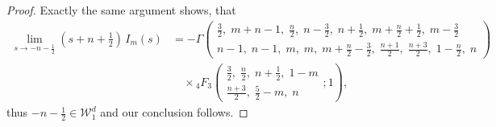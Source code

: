 \documentclass[10pt,a4paper]{amsart}
\begin{document}
\begin{proof}
Exactly the same argument shows, that 
\begin{align*}
     \lim_{s\rightarrow -n-\frac{1}{2}} (s+n+\frac{1}{2})\,I_m(s) &=
-\Gamma\!\left(
\begin{matrix}
\frac32, \; m+n-1,\; \frac n2,\; n-\frac32,\; n+\frac12,\;
m+\frac n2+\frac12,\; m-\frac32
\\[3pt]
n-1,\; n-1,\; m,\; m,\; m+\frac n2-\frac32,\;
\frac{n+1}{2},\; \frac{n+3}{2},\; 1-\frac n2,\; n
\end{matrix}
\right)
\\[6pt]
&\quad \times
{}_4F_3 \left(
\begin{matrix}
\frac32,\; \frac n2,\; n+\frac12,\; 1-m\\[3pt]
\frac{n+3}{2},\; \frac52-m,\; n
\end{matrix};1
\right),
 \end{align*}
thus $-n-\frac{1}{2} \in \mathcal{W}_1^d$ and our conclusion follows.
\end{proof}
\end{document}
